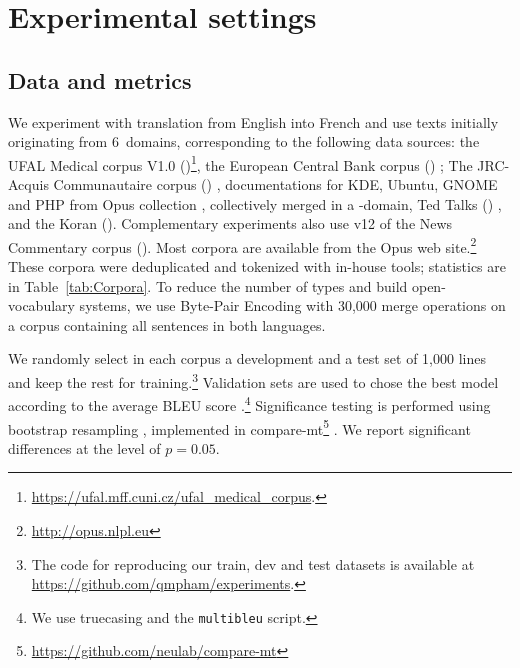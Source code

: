 \section{Experimental settings \label{sec:experiments}}

\subsection{Data and metrics \label{ssec:corpora}}

We experiment with translation from English into French and use texts initially originating from 6~domains, corresponding to the following data sources: the UFAL Medical corpus V1.0 ()\footnote{\url{https://ufal.mff.cuni.cz/ufal_medical_corpus}. }, the European Central Bank corpus () \cite{Tiedemann12parallel}; The JRC-Acquis Communautaire corpus () \cite{Steinberger06acquis}, documentations for KDE, Ubuntu, GNOME and PHP from Opus collection \cite{Tiedemann09news}, collectively merged in a -domain, Ted Talks () \cite{Cettolo12wit}, and the Koran (). Complementary experiments also use v12 of the News Commentary corpus (). Most corpora are available from the Opus web site.\footnote{\url{http://opus.nlpl.eu}} These corpora were deduplicated and tokenized with in-house tools; statistics are in Table~\ref{tab:Corpora}. To reduce the number of types and build open-vocabulary systems, we use Byte-Pair Encoding \cite{Sennrich16neural} with 30,000 merge operations on a corpus containing all sentences in both languages.

We randomly select in each corpus a development and a test set of 1,000 lines and keep the rest for training.\footnote{The code for reproducing our train, dev and test datasets is available at \url{https://github.com/qmpham/experiments}.} Validation sets are used to chose the best model according to the average BLEU score \cite{Papineni02bleu}.\footnote{We use truecasing and the \texttt{multibleu} script.} Significance testing is performed using bootstrap resampling \cite{Koehn04statistical}, implemented in compare-mt\footnote{\url{https://github.com/neulab/compare-mt}} \cite{Neubig19compare-mt}. We report significant differences at the level of $p=0.05$.

